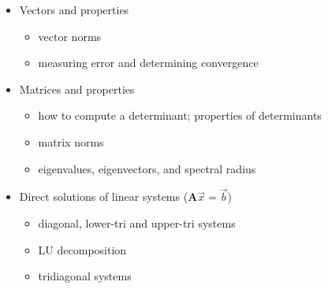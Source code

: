 \documentclass[12pt]{article}
\newcommand{\ve}[1]{\ensuremath{\mathbf{#1}}}
\begin{document}
\begin{itemize}
\item Vectors and properties
  \begin{itemize}
  \item vector norms
  \item measuring error and determining convergence
  \end{itemize}

\item Matrices and properties
  \begin{itemize}
  \item how to compute a determinant; properties of determinants
  \item matrix norms
  \item eigenvalues, eigenvectors, and spectral radius
  \end{itemize}

\item Direct solutions of linear systems ($\ve{A}\vec{x} = \vec{b}$)
  \begin{itemize}
  \item diagonal, lower-tri and upper-tri systems
  \item LU decomposition
  \item tridiagonal systems
  \end{itemize}
\end{itemize}
\end{document}
